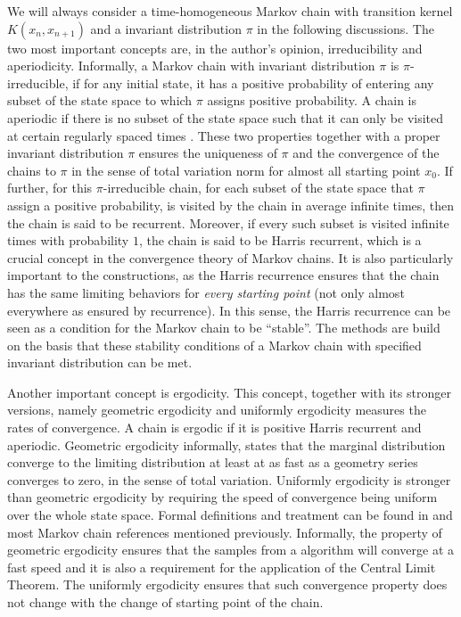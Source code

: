 We will always consider a time-homogeneous Markov chain with transition kernel
$K(x_n,x_{n+1})$ and a invariant distribution $\pi$ in the following
discussions. The two most important concepts are, in the author's opinion,
irreducibility and aperiodicity. Informally, a Markov chain with invariant
distribution $\pi$ is $\pi$-irreducible, if for any initial state, it has a
positive probability of entering any subset of the state space to which $\pi$
assigns positive probability. A chain is aperiodic if there is no subset of
the state space such that it can only be visited at certain regularly spaced
times \parencite{Tierney1994}. These two properties together with a proper
invariant distribution $\pi$ ensures the uniqueness of $\pi$ and the
convergence of the chains to $\pi$ in the sense of total variation norm for
almost all starting point $x_0$. If further, for this $\pi$-irreducible chain,
for each subset of the state space that $\pi$ assign a positive probability,
is visited by the chain in average infinite times, then the chain is said to
be recurrent. Moreover, if every such subset is visited infinite times with
probability $1$, the chain is said to be Harris recurrent, which is a crucial
concept in the convergence theory of Markov chains. It is also particularly
important to the \mcmc constructions, as the Harris recurrence ensures that
the chain has the same limiting behaviors for \emph{every starting point} (not
only almost everywhere as ensured by recurrence). In this sense, the Harris
recurrence can be seen as a condition for the Markov chain to be ``stable''.
The \mcmc methods are build on the basis that these stability conditions of a
Markov chain with specified invariant distribution can be met.

Another important concept is ergodicity. This concept, together with its
stronger versions, namely geometric ergodicity and uniformly ergodicity
measures the rates of convergence. A chain is ergodic if it is positive Harris
recurrent and aperiodic. Geometric ergodicity informally, states that the
marginal distribution converge to the limiting distribution at least at as
fast as a geometry series converges to zero, in the sense of total variation.
Uniformly ergodicity is stronger than geometric ergodicity by requiring the
speed of convergence being uniform over the whole state space. Formal
definitions and treatment can be found in \textcite[][chap.~6]{Robert2004} and
most Markov chain references mentioned previously. Informally, the property of
geometric ergodicity ensures that the samples from a \mcmc algorithm will
converge at a fast speed and it is also a requirement for the application of
the Central Limit Theorem. The uniformly ergodicity ensures that such
convergence property does not change with the change of starting point of the
chain.

